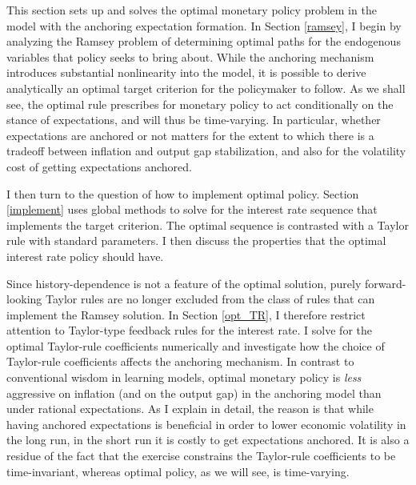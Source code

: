 \documentclass[11pt]{article}
\renewcommand{\[}{\begin{equation}}
\renewcommand{\]}{\end{equation}}
\begin{document}
This section sets up and solves the optimal monetary policy problem in the model with the anchoring expectation formation. In Section \ref{ramsey}, I begin by analyzing the Ramsey problem of determining optimal paths for the endogenous variables that policy seeks to bring about.  While the anchoring mechanism introduces substantial nonlinearity into the model, it is possible to derive analytically an optimal target criterion for the policymaker to follow. As we shall see, the optimal rule prescribes for monetary policy to act conditionally on the stance of expectations, and will thus be time-varying. In particular, whether expectations are anchored or not matters for the extent to which there is a tradeoff between inflation and output gap stabilization, and also for the volatility cost of getting expectations anchored.  

I then turn to the question of how to implement optimal policy. Section \ref{implement} uses global methods to solve for the interest rate sequence that implements the target criterion. The optimal sequence is contrasted with a Taylor rule with standard parameters. I then discuss the properties that the optimal interest rate policy should have. 

Since history-dependence is not a feature of the optimal solution, purely forward-looking Taylor rules are no longer excluded from the class of rules that can implement the Ramsey solution. In Section \ref{opt_TR}, I therefore restrict attention to Taylor-type feedback rules for the interest rate. I solve for the optimal Taylor-rule coefficients numerically and investigate how the choice of Taylor-rule coefficients affects the anchoring mechanism. In contrast to conventional wisdom in learning models, optimal monetary policy is \emph{less} aggressive on inflation (and on the output gap) in the anchoring model than under rational expectations. As I explain in detail, the reason is that while having anchored expectations is beneficial in order to lower economic volatility in the long run, in the short run it is costly to get expectations anchored. It is also a residue of the fact that the exercise constrains the Taylor-rule coefficients to be time-invariant, whereas optimal policy, as we will see, is time-varying.

\end{document}
